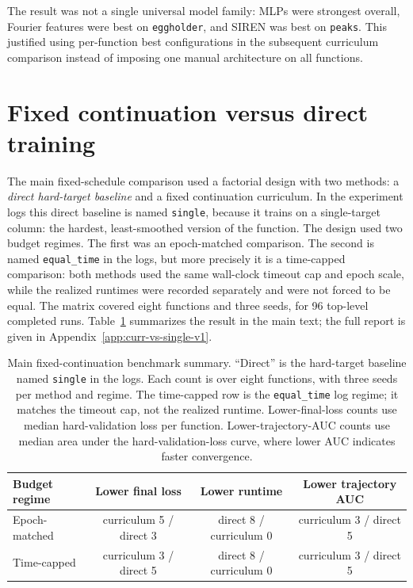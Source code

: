 \documentclass[english,master,a4paper,oneside]{ppfcmthesis}
\begin{document}
The result was not a single universal model family: MLPs were strongest overall,
Fourier features were best on \texttt{eggholder}, and SIREN was best on
\texttt{peaks}. This justified using per-function best configurations in the
subsequent curriculum comparison instead of imposing one manual architecture on
all functions.

\section{Fixed continuation versus direct training}

The main fixed-schedule comparison used a factorial design with two methods: a
\emph{direct hard-target baseline} and a fixed continuation curriculum. In the
experiment logs this direct baseline is named \texttt{single}, because it trains
on a single-target column: the hardest, least-smoothed version of the function.
The design used two budget regimes. The first was an epoch-matched comparison.
The second is named \texttt{equal\_time} in the logs, but more precisely it is a
time-capped comparison: both methods used the same wall-clock timeout cap and
epoch scale, while the realized runtimes were recorded separately and were not
forced to be equal. The matrix covered eight functions and three seeds, for 96
top-level completed runs. Table~\ref{tab:main-regression-counts} summarizes the
result in the main text; the full report is given in
Appendix~\ref{app:curr-vs-single-v1}.

\begin{table}[htbp]
\centering
\small
\begin{tabular}{lccc}
\toprule
Budget regime & Lower final loss & Lower runtime & Lower trajectory AUC \\
\midrule
Epoch-matched & curriculum 5 / direct 3 & direct 8 / curriculum 0 & curriculum 3 / direct 5 \\
Time-capped & curriculum 3 / direct 5 & direct 8 / curriculum 0 & curriculum 3 / direct 5 \\
\bottomrule
\end{tabular}
\caption{Main fixed-continuation benchmark summary. ``Direct'' is the hard-target
baseline named \texttt{single} in the logs. Each count is over eight functions,
with three seeds per method and regime. The time-capped row is the
\texttt{equal\_time} log regime; it matches the timeout cap, not the realized
runtime. Lower-final-loss counts use median hard-validation loss per function.
Lower-trajectory-AUC counts use median area under the hard-validation-loss curve,
where lower AUC indicates faster convergence.}
\label{tab:main-regression-counts}
\end{table}
\end{document}
